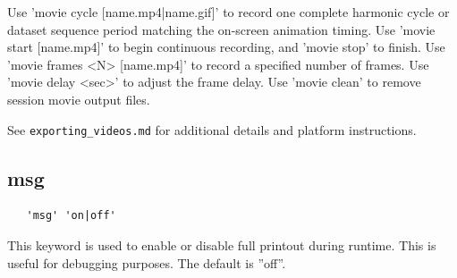 \documentclass{article}
\begin{document}
Use 'movie cycle [name.mp4|name.gif]' to record one complete harmonic cycle or dataset sequence period matching the on-screen animation timing. Use 'movie start [name.mp4]' to begin continuous recording, and 'movie stop' to finish. Use 'movie frames <N> [name.mp4]' to record a specified number of frames. Use 'movie delay <sec>' to adjust the frame delay. Use 'movie clean' to remove session movie output files.

See \texttt{exporting\_videos.md} for additional details and platform instructions. 

\subsection{\label{msg}msg}
\begin{verbatim}
   'msg' 'on|off' 
\end{verbatim}
This keyword is used to enable or disable full printout during runtime. This is useful for debugging purposes. The default is ''off''.
\end{document}

